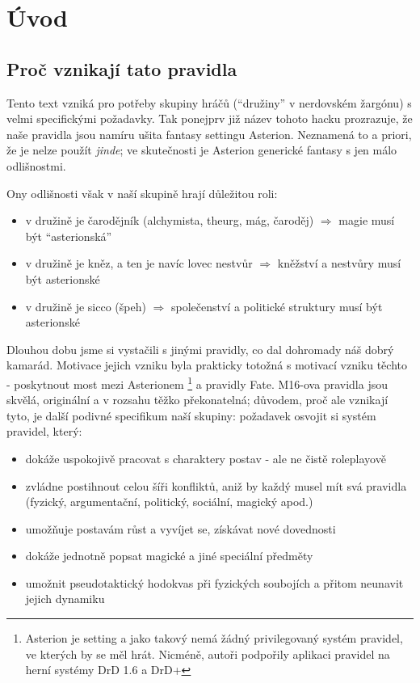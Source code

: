 \chapter{Úvod}
\label{chap:introduction}

\section{Proč vznikají tato pravidla}
\label{sec:proc-pravidla}


Tento text vzniká pro potřeby skupiny hráčů (``družiny'' v nerdovském žargónu) s velmi specifickými požadavky. Tak ponejprv již název tohoto hacku prozrazuje, že naše pravidla jsou namíru ušita fantasy settingu Asterion. Neznamená to a priori, že je nelze použít \textit{jinde}; ve skutečnosti je Asterion generické fantasy s jen málo odlišnostmi. 

Ony odlišnosti však v naší skupině hrají důležitou roli:

\begin{itemize}
\item v družině je čarodějník (alchymista, theurg, mág, čaroděj) $\Rightarrow$ magie musí být ``asterionská''
\item v družině je kněz, a ten je navíc lovec nestvůr $\Rightarrow$ kněžství a nestvůry musí být asterionské
\item v družině je sicco (špeh) $\Rightarrow$ společenství a politické struktury musí být asterionské
\end{itemize}

Dlouhou dobu jsme si vystačili s jinými pravidly, co dal dohromady náš dobrý kamarád. Motivace jejich vzniku byla prakticky totožná s motivací vzniku těchto - poskytnout most mezi Asterionem \footnote{Asterion je setting a jako takový nemá žádný privilegovaný systém pravidel, ve kterých by se měl hrát. Nicméně, autoři podpořily aplikaci pravidel na herní systémy DrD 1.6 a DrD+} a pravidly Fate. M16-ova pravidla jsou skvělá, originální a v rozsahu těžko překonatelná; důvodem, proč ale vznikají tyto, je další podivné specifikum naší skupiny: požadavek osvojit si systém pravidel, který:

\begin{itemize}
\item dokáže uspokojivě pracovat s charaktery postav - ale ne čistě roleplayově
\item zvládne postihnout celou šíři konfliktů, aniž by každý musel mít svá pravidla (fyzický, argumentační, politický, sociální, magický apod.)
\item umožňuje postavám růst a vyvíjet se, získávat nové dovednosti
\item dokáže jednotně popsat magické a jiné speciální předměty
\item umožnit pseudotaktický hodokvas při fyzických soubojích a přitom neunavit jejich dynamiku
\end{itemize}

